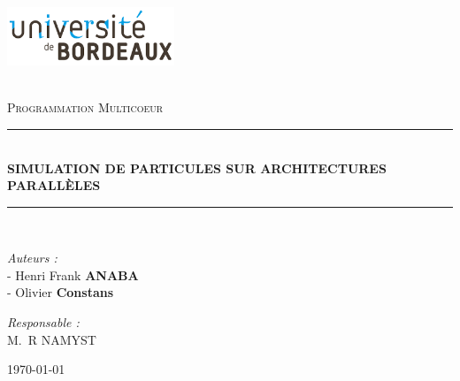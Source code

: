 \documentclass[a4paper,11pt]{report}
\newcommand{\reporttitle}{SIMULATION DE PARTICULES SUR ARCHITECTURES PARALLÈLES}     %
\newcommand{\reportauthor}{- Henri Frank \textbf{ANABA}\\ - Olivier \textbf{Constans}}%
\newcommand{\reportsubject}{Programmation Multicoeur} %
\begin{document}
\newcommand{\Aut}{\mathcal{A}}
\newcommand{\N}{\mathbb{N}}
\newcommand{\R}{\mathcal{R}}
\newcommand{\T}{\mathcal{T}}
\newcommand{\F}{\mathcal{F}}
\newcommand{\HRule}{\rule{\linewidth}{0.5mm}}

\begin{center}

\begin{minipage}[t]{0.48\textwidth}
  \begin{flushleft}
    \includegraphics [width=50mm]{images/index.png} \\[0.5cm]
  \end{flushleft}
\end{minipage}
\begin{minipage}[t]{0.48\textwidth}
  \begin{flushright}
  \end{flushright}
\end{minipage} \\[1.5cm]

\textsc{\Large \reportsubject}\\[0.5cm]
\HRule \\[0.4cm]
{\huge \bfseries \reporttitle}\\[0.4cm]
\HRule \\[1.5cm]

\vfill

\begin{minipage}[t]{0.6\textwidth}
  \begin{flushleft} \large
    \emph{Auteurs :}\\ 
    \reportauthor
  \end{flushleft}
\end{minipage}

\hfill
\vfill
\vfill
\vfill

\begin{minipage}[t]{0.6\textwidth}
  \begin{flushright} \large
    \emph{Responsable :} \\
    M.~R \textsc{NAMYST}\\
  \end{flushright}
\end{minipage}

\vfill

{\large \today}

\end{center}
\end{document}
